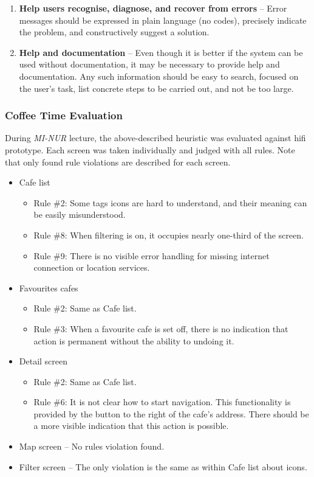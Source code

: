 \begin{enumerate}
    \item \textbf{Help users recognise, diagnose, and recover from errors} -- Error messages should be expressed in plain language (no codes), precisely indicate the problem, and constructively suggest a solution.
    
    \item \textbf{Help and documentation} -- Even though it is better if the system can be used without documentation, it may be necessary to provide help and documentation. Any such information should be easy to search, focused on the user's task, list concrete steps to be carried out, and not be too large.
\end{enumerate}
\subsubsection{Coffee Time Evaluation}
During \textit{MI-NUR} lecture, the above-described heuristic was evaluated against \gls{hifi} prototype. Each screen was taken individually and judged with all rules. Note that only found rule violations are described for each screen.

\begin{itemize}
    \item Cafe list
    \begin{itemize}
        \item Rule \#2: Some tags icons are hard to understand, and their meaning can be easily misunderstood. 
        \item Rule \#8: When filtering is on, it occupies nearly one-third of the screen.
        \item Rule \#9: There is no visible error handling for missing internet connection or location services.
    \end{itemize}
    \item Favourites cafes
    \begin{itemize}
        \item Rule \#2: Same as Cafe list.
        \item Rule \#3: When a favourite cafe is set off, there is no indication that action is permanent without the ability to undoing it. 
    \end{itemize}
    \item Detail screen
    \begin{itemize}
        \item Rule \#2: Same as Cafe list.
        \item Rule \#6: It is not clear how to start navigation. This functionality is provided by the button to the right of the cafe's address. There should be a more visible indication that this action is possible.
    \end{itemize}
    \item Map  screen -- No rules violation found. 
    \item Filter screen -- The only violation is the same as within Cafe list about icons.
\end{itemize}

